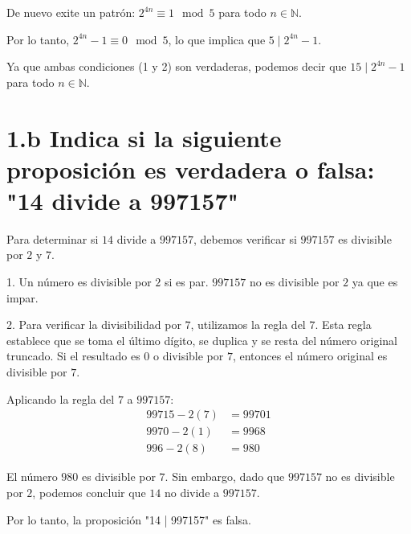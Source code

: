 \documentclass{article}
\begin{document}
De nuevo exite un patrón: $2^{4n} \equiv 1 \mod 5$ para todo $n \in \mathbb{N}$.

Por lo tanto, $2^{4n} - 1 \equiv 0 \mod 5$, lo que implica que $5 \mid 2^{4n} - 1$.

Ya que ambas condiciones (1 y 2) son verdaderas, podemos decir que $15 \mid 2^{4n} - 1$ para todo $n \in \mathbb{N}$.

\section*{1.b Indica si la siguiente proposición es verdadera o falsa: "14 divide a 997157"}    

Para determinar si $14$ divide a $997157$, debemos verificar si $997157$ es divisible por $2$ y $7$. 

1. Un número es divisible por $2$ si es par. $997157$ no es divisible por $2$ ya que es impar.

2. Para verificar la divisibilidad por $7$, utilizamos la regla del $7$. Esta regla establece que se toma el último dígito, se duplica y se resta del número original truncado. Si el resultado es $0$ o divisible por $7$, entonces el número original es divisible por $7$. 

Aplicando la regla del $7$ a $997157$:
\begin{align*}
99715 - 2(7) &= 99701 \\
9970 - 2(1) &= 9968 \\
996 - 2(8) &= 980
\end{align*}

El número $980$ es divisible por $7$. Sin embargo, dado que $997157$ no es divisible por $2$, podemos concluir que $14$ no divide a $997157$.

Por lo tanto, la proposición "14 | 997157" es falsa.
\end{document}
